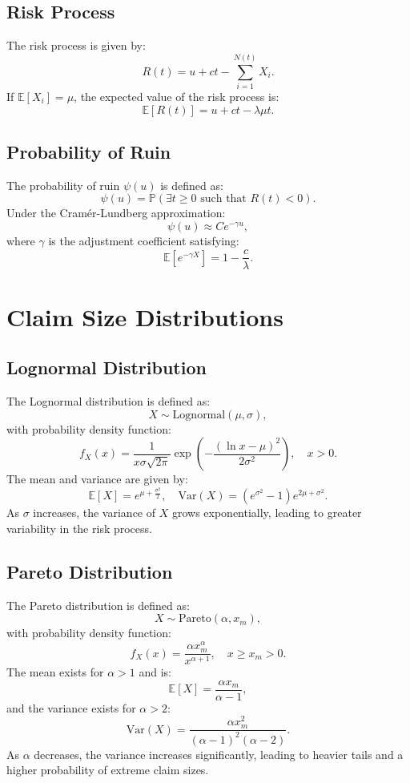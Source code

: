 \documentclass[12pt]{article}
\begin{document}
	\subsection{Risk Process}
	The risk process is given by:
	\[
	R(t) = u + ct - \sum_{i=1}^{N(t)} X_i.
	\]
	If $\mathbb{E}[X_i] = \mu$, the expected value of the risk process is:
	\[
	\mathbb{E}[R(t)] = u + ct - \lambda \mu t.
	\]
	
	\subsection{Probability of Ruin}
	The probability of ruin $\psi(u)$ is defined as:
	\[
	\psi(u) = \mathbb{P}(\exists t \geq 0 \text{ such that } R(t) < 0).
	\]
	Under the Cram\'er-Lundberg approximation:
	\[
	\psi(u) \approx Ce^{-\gamma u},
	\]
	where $\gamma$ is the adjustment coefficient satisfying:
	\[
	\mathbb{E}[e^{-\gamma X}] = 1 - \frac{c}{\lambda}.
	\]
	
	\section{Claim Size Distributions}
	\subsection{Lognormal Distribution}
	The Lognormal distribution is defined as:
	\[
	X \sim \text{Lognormal}(\mu, \sigma),
	\]
	with probability density function:
	\[
	f_X(x) = \frac{1}{x \sigma \sqrt{2\pi}} \exp\left(-\frac{(\ln x - \mu)^2}{2\sigma^2}\right), \quad x > 0.
	\]
	The mean and variance are given by:
	\[
	\mathbb{E}[X] = e^{\mu + \frac{\sigma^2}{2}}, \quad \text{Var}(X) = \left(e^{\sigma^2} - 1\right)e^{2\mu + \sigma^2}.
	\]
	As $\sigma$ increases, the variance of $X$ grows exponentially, leading to greater variability in the risk process.
	
	\subsection{Pareto Distribution}
	The Pareto distribution is defined as:
	\[
	X \sim \text{Pareto}(\alpha, x_m),
	\]
	with probability density function:
	\[
	f_X(x) = \frac{\alpha x_m^\alpha}{x^{\alpha + 1}}, \quad x \geq x_m > 0.
	\]
	The mean exists for $\alpha > 1$ and is:
	\[
	\mathbb{E}[X] = \frac{\alpha x_m}{\alpha - 1},
	\]
	and the variance exists for $\alpha > 2$:
	\[
	\text{Var}(X) = \frac{\alpha x_m^2}{(\alpha - 1)^2(\alpha - 2)}.
	\]
	As $\alpha$ decreases, the variance increases significantly, leading to heavier tails and a higher probability of extreme claim sizes.
	
\end{document}
